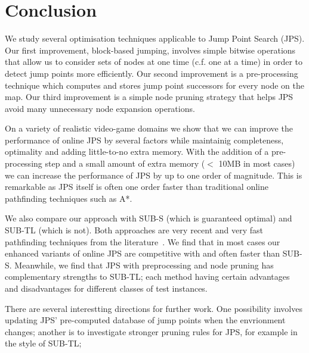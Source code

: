 \section{Conclusion}
\label{sec::conclusion}
We study several optimisation techniques applicable to Jump Point Search (JPS).
Our first improvement, block-based jumping, involves simple bitwise
operations that allow us to consider sets of nodes at one time (c.f. one
at a time) in order to detect jump points more efficiently. Our second
improvement is a pre-processing technique which computes and stores jump point
successors for every node on the map. Our third improvement is a simple node
pruning strategy that helps JPS avoid many unnecessary node expansion operations.

On a variety of realistic video-game domains we show that we can improve 
the performance of online JPS by several factors while maintainig
completeness, optimality and adding little-to-no extra memory. With the addition
of a pre-processing step and a small amount of extra memory ($<$ 10MB in most cases) 
we can increase the performance of JPS by up to one order of magnitude.  This is
remarkable as JPS itself is often one order faster than traditional online 
pathfinding techniques such as A*.

We also compare our approach with SUB-S (which is guaranteed optimal) and SUB-TL 
(which is not). Both approaches are very recent and very fast pathfinding techniques from the 
literature~\cite{urasKH13}. We find that in most cases our enhanced variants of online 
JPS are competitive with and often faster than SUB-S. Meanwhile, we find that JPS with
preprocessing and node pruning has complementary strengths to SUB-TL; each method having
certain advantages and disadvantages for different classes of test instances.

There are several interestting directions for further work. One possibility involves
updating JPS' pre-computed database of jump points when the envrionment changes; another 
is to investigate stronger pruning rules for JPS, for example in the style of SUB-TL;
